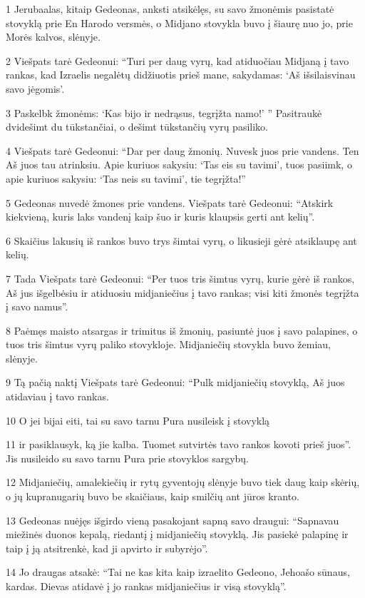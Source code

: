 \par 1 Jerubaalas, kitaip Gedeonas, anksti atsikėlęs, su savo žmonėmis pasistatė stovyklą prie En Harodo versmės, o Midjano stovykla buvo į šiaurę nuo jo, prie Morės kalvos, slėnyje. 
\par 2 Viešpats tarė Gedeonui: “Turi per daug vyrų, kad atiduočiau Midjaną į tavo rankas, kad Izraelis negalėtų didžiuotis prieš mane, sakydamas: ‘Aš išsilaisvinau savo jėgomis’. 
\par 3 Paskelbk žmonėms: ‘Kas bijo ir nedrąsus, tegrįžta namo!’ ” Pasitraukė dvidešimt du tūkstančiai, o dešimt tūkstančių vyrų pasiliko. 
\par 4 Viešpats tarė Gedeonui: “Dar per daug žmonių. Nuvesk juos prie vandens. Ten Aš juos tau atrinksiu. Apie kuriuos sakysiu: ‘Tas eis su tavimi’, tuos pasiimk, o apie kuriuos sakysiu: ‘Tas neis su tavimi’, tie tegrįžta!” 
\par 5 Gedeonas nuvedė žmones prie vandens. Viešpats tarė Gedeonui: “Atskirk kiekvieną, kuris laks vandenį kaip šuo ir kuris klaupsis gerti ant kelių”. 
\par 6 Skaičius lakusių iš rankos buvo trys šimtai vyrų, o likusieji gėrė atsiklaupę ant kelių. 
\par 7 Tada Viešpats tarė Gedeonui: “Per tuos tris šimtus vyrų, kurie gėrė iš rankos, Aš jus išgelbėsiu ir atiduosiu midjaniečius į tavo rankas; visi kiti žmonės tegrįžta į savo namus”. 
\par 8 Paėmęs maisto atsargas ir trimitus iš žmonių, pasiuntė juos į savo palapines, o tuos tris šimtus vyrų paliko stovykloje. Midjaniečių stovykla buvo žemiau, slėnyje. 
\par 9 Tą pačią naktį Viešpats tarė Gedeonui: “Pulk midjaniečių stovyklą, Aš juos atidaviau į tavo rankas. 
\par 10 O jei bijai eiti, tai su savo tarnu Pura nusileisk į stovyklą 
\par 11 ir pasiklausyk, ką jie kalba. Tuomet sutvirtės tavo rankos kovoti prieš juos”. Jis nusileido su savo tarnu Pura prie stovyklos sargybų. 
\par 12 Midjaniečių, amalekiečių ir rytų gyventojų slėnyje buvo tiek daug kaip skėrių, o jų kupranugarių buvo be skaičiaus, kaip smilčių ant jūros kranto. 
\par 13 Gedeonas nuėjęs išgirdo vieną pasakojant sapną savo draugui: “Sapnavau miežinės duonos kepalą, riedantį į midjaniečių stovyklą. Jis pasiekė palapinę ir taip į ją atsitrenkė, kad ji apvirto ir subyrėjo”. 
\par 14 Jo draugas atsakė: “Tai ne kas kita kaip izraelito Gedeono, Jehoašo sūnaus, kardas. Dievas atidavė į jo rankas midjaniečius ir visą stovyklą”. 
